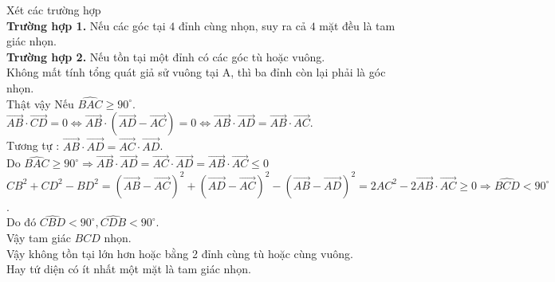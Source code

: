\begin{ex}
{		
		Xét các trường hợp\\
		\textbf{Trường hợp 1.} Nếu các góc tại $4$ đỉnh cùng nhọn, suy ra cả $4$ mặt đều là tam giác nhọn.\\
		\textbf{Trường hợp 2.} Nếu tồn tại một đỉnh có các góc tù hoặc vuông.\\ Không mất tính tổng quát giả sử vuông tại A, thì ba đỉnh còn lại phải là góc nhọn.\\
		Thật vậy
		Nếu $\widehat{BAC}\ge 90^\circ$.\\
		$\overrightarrow{AB}\cdot \overrightarrow{CD}=0\Leftrightarrow \overrightarrow{AB}\cdot \left(\overrightarrow{AD}-\overrightarrow{AC}\right)=0\Leftrightarrow \overrightarrow{AB}\cdot \overrightarrow{AD}=\overrightarrow{AB} \cdot \overrightarrow{AC}$.\\
		Tương tự : $\overrightarrow{AB}\cdot \overrightarrow{AD}=\overrightarrow{AC} \cdot \overrightarrow{AD}$.\\
		Do $\widehat{BAC}\ge 90^\circ\Rightarrow \overrightarrow{AB}\cdot \overrightarrow{AD}=\overrightarrow{AC} \cdot \overrightarrow{AD}=\overrightarrow{AB} \cdot \overrightarrow{AC}\le 0$\\
		$CB^2+CD^2-BD^2=\left(\overrightarrow{AB}-\overrightarrow{AC}\right)^2+\left(\overrightarrow{AD}-\overrightarrow{AC}\right)^2-\left(\overrightarrow{AB}-\overrightarrow{AD}\right)^2=2AC^2-2\overrightarrow{AB}\cdot \overrightarrow{AC} \ge 0\Rightarrow \widehat{BCD}<90^\circ$.\\
		Do đó $\widehat{CBD}<90^\circ,\widehat{CDB}<90^\circ$.\\
		Vậy tam giác $BCD$ nhọn.\\
		Vậy không tồn tại lớn hơn hoặc bằng 2 đỉnh cùng tù hoặc cùng vuông.\\
		Hay tứ diện có ít nhất một mặt là tam giác nhọn.
		
	}
\end{ex}
